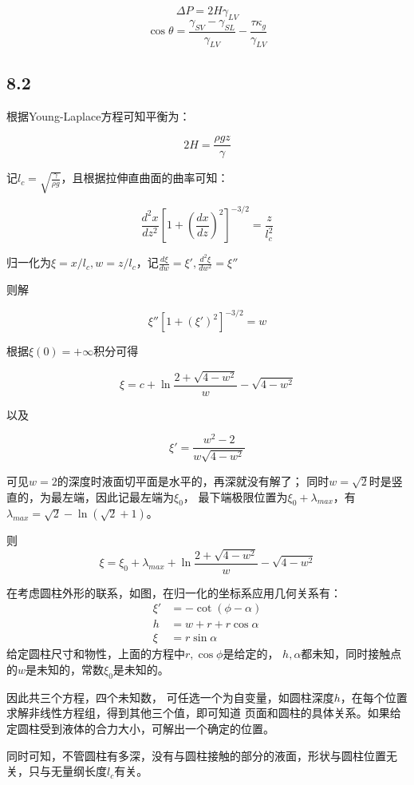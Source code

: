 \documentclass[UTF8,zihao=5]{ctexart}
\begin{document}
$$
    \Delta P = 2H\gamma_{LV}
$$
$$
    \cos \theta = \frac{\gamma_{SV}-\gamma_{SL}}{\gamma_{LV}} - \frac{\tau\kappa_g}{\gamma_{LV}}
$$

\subsection*{8.2}

根据Young-Laplace方程可知平衡为：

$$
    2H=\frac{\rho gz}{\gamma}
$$

记$l_c=\sqrt{\frac{\gamma}{\rho g}}$，且根据拉伸直曲面的曲率可知：

$$
    \frac{d^2x}{dz^2}\left[1+\left(\frac{dx}{dz}\right)^2\right]^{-3/2} = \frac{z}{l_c^2}
$$

归一化为$\xi = x/l_c, w = z/l_c$，记$\frac{d\xi}{dw}=\xi', \frac{d^2\xi}{dw^2}=\xi''$

则解

$$
    \xi'' \left[1+\left(\xi'\right)^2\right]^{-3/2} = w
$$

根据$\xi(0)=+\infty$积分可得

$$
    \xi = c + \ln\frac{2 + \sqrt{4-w^2}}{w} - \sqrt{4-w^2}
$$

以及

$$
    \xi' = \frac{w^2-2}{w\sqrt{4-w^2}}
$$

可见$w=2$的深度时液面切平面是水平的，再深就没有解了；
同时$w=\sqrt{2}$时是竖直的，为最左端，因此记最左端为$\xi_0$，
最下端极限位置为$\xi_0+\lambda_{max}$，有$\lambda_{max}=\sqrt{2}-\ln(\sqrt{2}+1)$。

则
$$
    \xi = \xi_0 + \lambda_{max} + \ln\frac{2 + \sqrt{4-w^2}}{w} - \sqrt{4-w^2}
$$

在考虑圆柱外形的联系，如图，在归一化的坐标系应用几何关系有：
$$
    \begin{aligned}
        \xi' & =-\cot(\phi-\alpha)   \\
        h    & = w + r + r\cos\alpha \\
        \xi  & =  r\sin\alpha
    \end{aligned}
$$
给定圆柱尺寸和物性，上面的方程中$r,\cos\phi$是给定的，
$h,\alpha$都未知，同时接触点的$w$是未知的，常数$\xi_0$是未知的。

因此共三个方程，四个未知数，
可任选一个为自变量，如圆柱深度$h$，在每个位置求解非线性方程组，得到其他三个值，即可知道
页面和圆柱的具体关系。如果给定圆柱受到液体的合力大小，可解出一个确定的位置。

同时可知，不管圆柱有多深，没有与圆柱接触的部分的液面，形状与圆柱位置无关，只与无量纲长度$l_c$有关。
\end{document}
